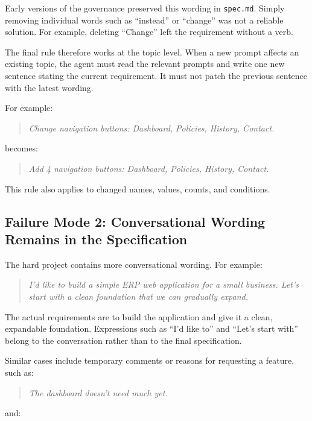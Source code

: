 Early versions of the governance preserved this wording in
\texttt{spec.md}. Simply removing individual words such as ``instead'' or ``change''
was not a reliable solution. For example, deleting ``Change'' left
the requirement without a verb.

The final rule therefore works at the topic level. When a new prompt affects
an existing topic, the agent must read the relevant prompts and write one new
sentence stating the current requirement. It must not patch the previous
sentence with the latest wording.

For example:

\begin{quote}
  \emph{Change navigation buttons: Dashboard, Policies, History, Contact.}
\end{quote}

becomes:

\begin{quote}
  \emph{Add 4 navigation buttons: Dashboard, Policies, History, Contact.}
\end{quote}

This rule also applies to changed names, values, counts, and conditions.

\subsection{Failure Mode 2: Conversational Wording Remains in the Specification}
\label{sec:rq2-conversational-wording}

The hard project contains more conversational wording. For example:

\begin{quote}
  \emph{I'd like to build a simple ERP web application for a small business.
  Let's start with a clean foundation that we can gradually expand.}
\end{quote}

The actual requirements are to build the application and give it a clean,
expandable foundation. Expressions such as ``I'd like to'' and ``Let's start
with'' belong to the conversation rather than to the final specification.

Similar cases include temporary comments or reasons for requesting a feature,
such as:

\begin{quote}
  \emph{The dashboard doesn't need much yet.}
\end{quote}

and:

